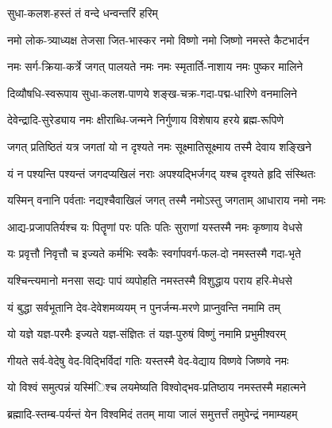 

{सुधा-कलश-हस्तं तं वन्दे धन्वन्तरिं हरिम्}


\twolineshloka
{नमो लोक-त्र्याध्यक्ष तेजसा जित-भास्कर}
{नमो विष्णो नमो जिष्णो नमस्ते कैटभार्दन}%

\twolineshloka
{नमः सर्ग-क्रिया-कर्त्रे जगत् पालयते नमः}
{नमः स्मृतार्ति-नाशाय नमः पुष्कर मालिने}%

\twolineshloka
{दिव्यौषधि-स्वरूपाय सुधा-कलश-पाणये}
{शङ्ख-चक्र-गदा-पद्म-धारिणे वनमालिने}%

\twolineshloka
{देवेन्द्रादि-सुरेड्याय नमः क्षीराब्धि-जन्मने}
{निर्गुणाय विशेषाय हरये ब्रह्म-रूपिणे}%

\twolineshloka
{जगत् प्रतिष्ठितं यत्र जगतां यो न दृश्यते}
{नमः सूक्ष्मातिसूक्ष्माय तस्मै देवाय शङ्खिने}%

\twolineshloka
{यं न पश्यन्ति पश्यन्तं जगदप्यखिलं नराः}
{अपश्यद्भिर्जगद् यश्च दृश्यते हृदि संस्थितः}%

\twolineshloka
{यस्मिन् वनानि पर्वताः नद्यश्चैवाखिलं जगत्}
{तस्मै नमोऽस्तु जगताम् आधाराय नमो नमः}%

\twolineshloka
{आद्य-प्रजापतिर्यश्च यः पितॄणां परः पतिः}
{पतिः सुराणां यस्तस्मै नमः कृष्णाय वेधसे}%

\twolineshloka
{यः प्रवृत्तौ निवृत्तौ च इज्यते कर्मभिः स्वकैः}
{स्वर्गापवर्ग-फल-दो नमस्तस्मै गदा-भृते}%

\twolineshloka
{यश्चिन्त्यमानो मनसा सद्यः पापं व्यपोहति}
{नमस्तस्मै विशुद्धाय पराय हरि-मेधसे}%

\twolineshloka
{यं बुद्धा सर्वभूतानि देव-देवेशमव्ययम्}
{न पुनर्जन्म-मरणे प्राप्नुवन्ति नमामि तम्}%

\twolineshloka
{यो यज्ञे यज्ञ-परमैः इज्यते यज्ञ-संज्ञितः}
{तं यज्ञ-पुरुषं विष्णुं नमामि प्रभुमीश्वरम्}%

\twolineshloka
{गीयते सर्व-वेदेषु वेद-विद्भिर्विदां गतिः}
{यस्तस्मै वेद-वेद्याय विष्णवे जिष्णवे नमः}%

\twolineshloka
{यो विश्वं समुत्पन्नं यस्मि॑िश्च लयमेष्यति}
{विश्वोद्भव-प्रतिष्ठाय नमस्तस्मै महात्मने}%

\twolineshloka
{ब्रह्मादि-स्तम्ब-पर्यन्तं येन विश्वमिदं ततम्}
{माया जालं समुत्तर्त्तं तमुपेन्द्रं नमाम्यहम्}%

